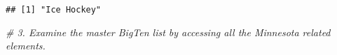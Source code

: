 \documentclass[
]{article}
\newenvironment{Shaded}{\begin{snugshade}}{\end{snugshade}}
\newcommand{\CommentTok}[1]{\textcolor[rgb]{0.56,0.35,0.01}{\textit{#1}}}
\newcommand{\DecValTok}[1]{\textcolor[rgb]{0.00,0.00,0.81}{#1}}
\newcommand{\NormalTok}[1]{#1}
\newcommand{\SpecialCharTok}[1]{\textcolor[rgb]{0.00,0.00,0.00}{#1}}
\begin{document}
\begin{Shaded}
\end{Shaded}

\begin{verbatim}
## [1] "Ice Hockey"
\end{verbatim}

\begin{Shaded}
\begin{Highlighting}[]
\CommentTok{\# 3. Examine the master BigTen list by accessing all the Minnesota related elements.}



\end{Highlighting}
\end{Shaded}
\end{document}
